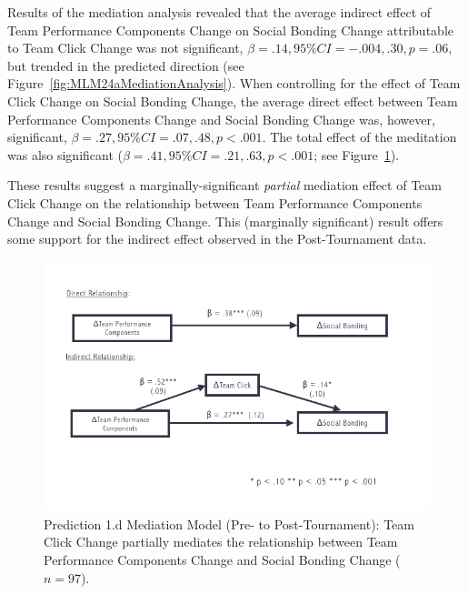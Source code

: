 \begin{CJK}{UTF8}{gbsn}
  Results of the mediation analysis revealed that the average indirect effect of Team Performance Components Change on Social Bonding Change attributable to Team Click Change was not significant, $\beta = .14, 95\% CI = -.004 , .30, p = .06$, but trended in the predicted direction (see Figure~\ref{fig:MLM24aMediationAnalysis}).  When controlling for the effect of Team Click Change on Social Bonding Change, the average direct effect between Team Performance Components Change and Social Bonding Change was, however, significant, $\beta = .27, 95\% CI = .07 , .48, p < .001$.  The total effect of the meditation was also significant ($\beta = .41, 95\% CI = .21 , .63, p < .001$; see Figure~\ref{fig:tournamentSurveyMedPrePost}).

  These results suggest a marginally-significant \textit{partial} mediation effect of Team Click Change on the relationship between Team Performance Components Change and Social Bonding Change.  This (marginally significant) result offers some support for the indirect effect observed in the Post-Tournament data.





  \begin{figure}
    \centering
    \includegraphics[width=0.9\linewidth,keepaspectratio] {images/tournamentSurveyMedPrePost}
    \caption{Prediction 1.d Mediation Model (Pre- to Post-Tournament): Team Click Change partially mediates the relationship between Team Performance Components Change and Social Bonding Change ($n = 97$).}
    \label{fig:tournamentSurveyMedPrePost}
  \end{figure}




\end{CJK}

